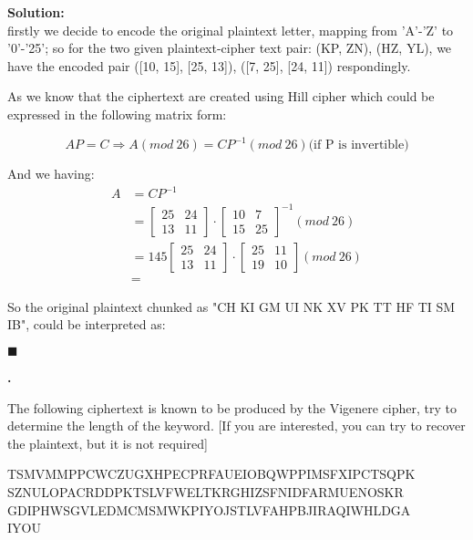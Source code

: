 \documentclass{article}
\newcounter{pcounter}                                   %
\newenvironment{problem}                                %
{                                                       %
    \stepcounter{pcounter}                              %
    \textbf{\arabic{pcounter}.}                         %
}{}                                                     %
\newenvironment{solution}                               %
{\textbf{Solution:} \\}{$\blacksquare$\newline}         %
\newcommand{\leadto}{\Rightarrow}                       %
\begin{document}
    \begin{solution}
        firstly we decide to encode the original plaintext letter, mapping from 'A'-'Z' to '0'-'25'; so for the two given plaintext-cipher text pair: (KP, ZN), (HZ, YL), we have the encoded pair ([10, 15], [25, 13]), ([7, 25], [24, 11]) respondingly.

        As we know that the ciphertext are created using Hill cipher which could be expressed in the following matrix form:

        $$
            AP = C \leadto A (mod\ 26) = C P^{-1} (mod\ 26) \text{(if P is invertible)}
        $$

        And we having:
        \begin{align*}
            A &= C P^{-1} \\
            &=  
                \begin{bmatrix}
                    25 & 24 \\
                    13 & 11
                \end{bmatrix}
                \cdot
                \begin{bmatrix}
                    10 & 7 \\
                    15 & 25
                \end{bmatrix}^{-1} (mod\ 26) \\
            &=  145
                \begin{bmatrix}
                    25 & 24 \\
                    13 & 11
                \end{bmatrix}
                \cdot
                \begin{bmatrix}
                    25 & 11 \\
                    19 & 10
                \end{bmatrix} (mod\ 26) \\
            &= 
        \end{align*}

        So the original plaintext chunked as "CH KI GM UI NK XV PK TT HF TI SM IB", could be interpreted as:

    \end{solution}

    \begin{problem}
        The following ciphertext is known to be produced by the Vigenere cipher, try to determine the length of the keyword. [If you are interested, you can try to recover the plaintext, but it is not required]

        TSMVMMPPCWCZUGXHPECPRFAUEIOBQWPPIMSFXIPCTSQPK \\
        SZNULOPACRDDPKTSLVFWELTKRGHIZSFNIDFARMUENOSKR \\
        GDIPHWSGVLEDMCMSMWKPIYOJSTLVFAHPBJIRAQIWHLDGA \\
        IYOU

    \end{problem}
    
\end{document}
